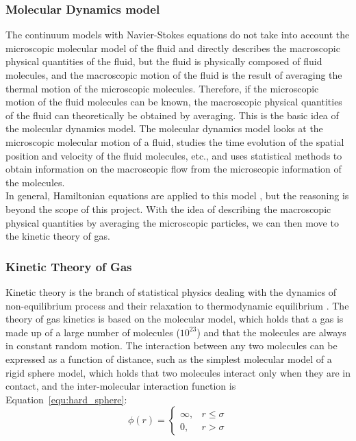 \subsubsection{Molecular Dynamics model} \label{sec:HE}
The continuum models with Navier-Stokes equations do not take into account the microscopic molecular model of the fluid and directly describes the macroscopic physical quantities of the fluid, but the fluid is physically composed of fluid molecules, and the macroscopic motion of the fluid is the result of averaging the thermal motion of the microscopic molecules. Therefore, if the microscopic motion of the fluid molecules can be known, the macroscopic physical quantities of the fluid can theoretically be obtained by averaging. This is the basic idea of the molecular dynamics model. The molecular dynamics model looks at the microscopic molecular motion of a fluid, studies the time evolution of the spatial position and velocity of the fluid molecules, etc., and uses statistical methods to obtain information on the macroscopic flow from the microscopic information of the molecules.\\

In general, Hamiltonian equations are applied to this model \cite{salmon1988hamiltonian}, but the reasoning is beyond the scope of this project. With the idea of describing the macroscopic physical quantities by averaging the microscopic particles, we can then move to the kinetic theory of gas.

\subsubsection{Kinetic Theory of Gas}\label{sec:BE}
Kinetic theory is the branch of statistical physics dealing with the dynamics of non-equilibrium process and their relaxation to thermodynamic equilibrium \cite{succi2001lattice}. The theory of gas kinetics is based on the molecular model, which holds that a gas is made up of a large number of molecules ($10^{23}$) and that the molecules are always in constant random motion. The interaction between any two molecules can be expressed as a function of distance, such as the simplest molecular model of a rigid sphere model, which holds that two molecules interact only when they are in contact, and the inter-molecular interaction function is Equation~\ref{equ:hard_sphere}:\\

\begin{equation}
\label{equ:hard_sphere}
\phi  (r) = \left\{\begin{matrix}
\infty, & r \leqslant \sigma \\ 
0, & r > \sigma
\end{matrix}\right.
\end{equation}


